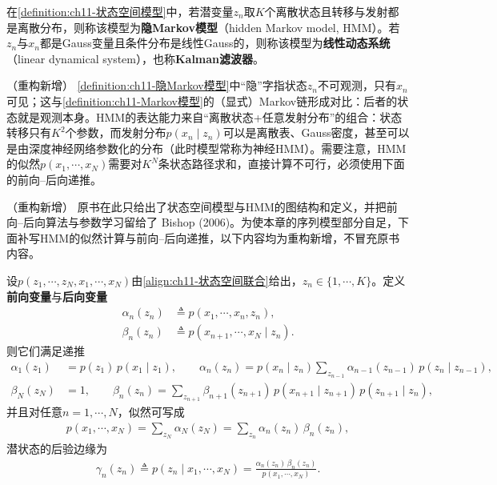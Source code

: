 \documentclass[../../main.tex]{subfiles}
\begin{document}
\begin{definition}[隐Markov模型]\label{definition:ch11-隐Markov模型}
在\cref{definition:ch11-状态空间模型}中，若潜变量$z_n$取$K$个离散状态且转移与发射都是离散分布，则称该模型为\textbf{隐Markov模型}（hidden Markov model, HMM）。若$z_n$与$x_n$都是Gauss变量且条件分布是线性Gauss的，则称该模型为\textbf{线性动态系统}（linear dynamical system），也称\textbf{Kalman滤波器}。
\end{definition}

\begin{remark}（重构新增）
\cref{definition:ch11-隐Markov模型}中“隐”字指状态$z_n$不可观测，只有$x_n$可见；这与\cref{definition:ch11-Markov模型}的（显式）Markov链形成对比：后者的状态就是观测本身。HMM的表达能力来自“离散状态+任意发射分布”的组合：状态转移只有$K^2$个参数，而发射分布$p(x_n\mid z_n)$可以是离散表、Gauss密度，甚至可以是由深度神经网络参数化的分布（此时模型常称为神经HMM）。需要注意，HMM的似然$p(x_1,\cdots,x_N)$需要对$K^N$条状态路径求和，直接计算不可行，必须使用下面的前向–后向递推。
\end{remark}

\begin{remark}（重构新增）
原书在此只给出了状态空间模型与HMM的图结构和定义，并把前向–后向算法与参数学习留给了 Bishop (2006)。为使本章的序列模型部分自足，下面补写HMM的似然计算与前向–后向递推，以下内容均为重构新增，不冒充原书内容。
\end{remark}

\begin{proposition}\label{proposition:ch11-前向后向}
设$p(z_1,\cdots,z_N,x_1,\cdots,x_N)$由\eqref{align:ch11-状态空间联合}给出，$z_n\in\{1,\cdots,K\}$。定义\textbf{前向变量}与\textbf{后向变量}
\begin{align}
  \alpha_n(z_n) &\triangleq p(x_1,\cdots,x_n,z_n),\\
  \beta_n(z_n) &\triangleq p(x_{n+1},\cdots,x_N\mid z_n).
\end{align}
则它们满足递推
\begin{align}
  \alpha_1(z_1) &= p(z_1)\,p(x_1\mid z_1),\qquad
  \alpha_n(z_n) = p(x_n\mid z_n)\sum_{z_{n-1}}\alpha_{n-1}(z_{n-1})\,p(z_n\mid z_{n-1}),
  \label{align:ch11-前向递推}\\
  \beta_N(z_N) &= 1,\qquad
  \beta_n(z_n) = \sum_{z_{n+1}}\beta_{n+1}(z_{n+1})\,p(x_{n+1}\mid z_{n+1})\,p(z_{n+1}\mid z_n),
  \label{align:ch11-后向递推}
\end{align}
并且对任意$n=1,\cdots,N$，似然可写成
\begin{align}
  p(x_1,\cdots,x_N) = \sum_{z_N}\alpha_N(z_N) = \sum_{z_n}\alpha_n(z_n)\,\beta_n(z_n),
  \label{align:ch11-似然前向后向}
\end{align}
潜状态的后验边缘为
\begin{align}
  \gamma_n(z_n) \triangleq p(z_n\mid x_1,\cdots,x_N) = \frac{\alpha_n(z_n)\,\beta_n(z_n)}{p(x_1,\cdots,x_N)}.
  \label{align:ch11-后验边缘}
\end{align}
\end{proposition}
\end{document}
